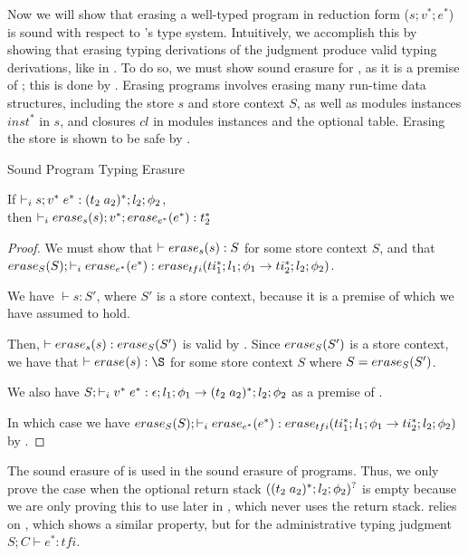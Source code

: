 Now we will show that erasing a well-typed \name program in reduction form ($s;v^{*};e^{*}$) is sound with respect to \wasm's type system.
Intuitively, we accomplish this by showing that erasing typing derivations of the  judgment produce valid \wasm typing derivations, like in .
To do so, we must show sound erasure for , as it is a premise of ; this is done by .
Erasing programs involves erasing many run-time data structures, including the store $s$ and store context $S$, as well as modules instances $inst^{*}$ in $s$, and closures $cl$ in modules instances and the optional table.
Erasing the store is shown to be safe by .

\begin{theorem}{Sound Program Typing Erasure}
    \label{thm:programerasure}

    If $\vdash_i s;v^{*}\;e^{*} : \ti{t_2}{a_2}^{*};l_2;\phi_2$,
    \\ then $\vdash_i \erase[s]{s};v^{*};\erase[e^{*}]{e^{*}} : t_2^{*}$
\end{theorem}
\begin{proof}

    We must show that $\vdash \erase[s]{s} : S$ for some \wasm store context $S$, and that $\erase[S]{S};\empty \vdash_i \erase[e^{*}]{e^{*}} : \erase[tfi]{ti_1^{*};l_1;\phi_1 \rightarrow ti_2^{*};l_2;\phi_2}$.

    We have $\vdash s : S'$, where $S'$ is a \name store context, because it is a premise of  which we have assumed to hold.

    Then, $\vdash \erase[s]{s} : \erase[S]{S'}$ is valid by .
    Since $\erase[S]{S'}$ is a \wasm store context, we have that $\vdash \erase{s} : \S$ for some \wasm store context $S$ where $S=\erase[S]{S'}$.

    We also have $S;\empty \vdash_i v^{*}\;e^{*} : \epsilon;l_1;\phi_1 \rightarrow \ti{t_2}{a_2}^{*};l_2;\phi_2$ as a premise of .

    In which case we have $\erase[S]{S};\empty \vdash_i \erase[e^{*}]{e^{*}} : \erase[tfi]{ti_1^{*};l_1;\phi_1 \rightarrow ti_2^{*};l_2;\phi_2}$ by .
\end{proof}

The sound erasure of  is used in the sound erasure of programs.
Thus, we only prove the case when the optional return stack $(\ti{t_2}{a_2}^{*};l_2;\phi_2)^{?}$ is empty because we are only proving this to use later in , which never uses the return stack.
 relies on , which shows a similar property, but for the administrative typing judgment $S;C \vdash e^{*} : tfi$.

